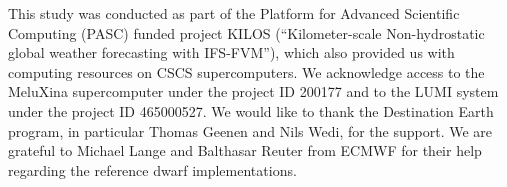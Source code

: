 \documentclass[../main.tex]{subfiles}
\begin{document}



	\begin{acknowledgements}
	    This study was conducted as part of the Platform for Advanced Scientific Computing (PASC) funded project KILOS (``Kilometer-scale Non-hydrostatic global weather forecasting with IFS-FVM''), which also provided us with  computing resources on CSCS supercomputers. We  acknowledge access to the MeluXina supercomputer under the project ID 200177 and to the LUMI system under the project ID 465000527. We would like to thank the Destination Earth program, in particular Thomas Geenen and Nils Wedi, for the support. We are grateful to Michael Lange and Balthasar Reuter from ECMWF for their help regarding the reference dwarf implementations.
	\end{acknowledgements}
\end{document}
